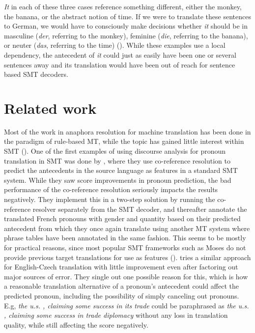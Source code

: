 \documentclass[11pt]{article}
\begin{document}
\emph{It} in each of these three cases reference something different, either the monkey, the banana, or the abstract notion of time. If we were to translate these sentences to German, we would have to consciously make decisions whether \emph{it} should be in masculine (\emph{der}, referring to the monkey), feminine (\emph{die}, referring to the banana), or neuter (\emph{das}, referring to the time) (\cite{Mitkov1995Anaphora}). While these examples use a local dependency, the antecedent of \emph{it} could just as easily have been one or several sentences away and its translation would have been out of reach for sentence based SMT decoders.


\section{Related work}


Most of the work in anaphora resolution for machine translation has been done in the paradigm of rule-based MT, while the topic has gained little interest within SMT (\cite{Hardmeier2010Modelling, Mitkov1999Introduction}).
One of the first examples of using discourse analysis for pronoun translation in SMT was done by \textcite{Nagard2010Aiding}, where they use co-reference resolution to predict the antecedents in the source language as features in a standard SMT system.
While they saw score improvements in pronoun prediction, the bad performance of the co-reference resolution seriously impacts the results negatively.
They implement this in a two-step solution by running the co-reference resolver separately from the SMT decoder, and thereafter annotate the translated French pronouns with gender and quantity based on their predicted antecedent from which they once again translate using another MT system where phrase tables have been annotated in the same fashion.
This seems to be mostly for practical reasons, since most popular SMT frameworks such as Moses do not provide previous target translations for use as features (\cite{Koehn2007Moses}).
\textcite{Guillou2012Improving} tries a similar approach for English-Czech translation with little improvement even after factoring out major sources of error. They single out one possible reason for this, which is how a reasonable translation alternative of a pronoun's antecedent could affect the predicted pronoun, including the possibility of simply canceling out pronouns. E.g, \emph{the u.s. , claiming some success in its trade} could be paraphrased as \emph{the u.s. , claiming some success in trade diplomacy} without any loss in translation quality, while still affecting the score negatively.
\end{document}
